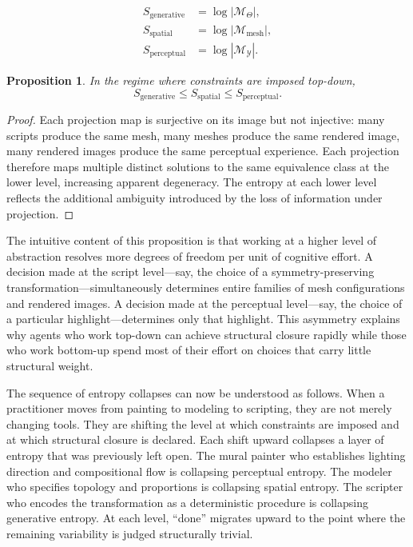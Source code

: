 \documentclass[11pt, twoside]{article}
\theoremstyle{plain}
\newtheorem{proposition}[theorem]{Proposition}
\theoremstyle{definition}
\theoremstyle{remark}
\begin{document}
\begin{align*}
S_{\text{generative}} &= \log |\mathcal{M}_\Theta|, \\
S_{\text{spatial}} &= \log |\mathcal{M}_{\text{mesh}}|, \\
S_{\text{perceptual}} &= \log |\mathcal{M}_{\mathcal{Y}}|.
\end{align*}

\begin{proposition}
\label{prop:entropy-ordering}
In the regime where constraints are imposed top-down,
\[
S_{\text{generative}} \leq S_{\text{spatial}} \leq S_{\text{perceptual}}.
\]
\end{proposition}

\begin{proof}
Each projection map is surjective on its image but not injective: many scripts produce the same mesh, many meshes produce the same rendered image, many rendered images produce the same perceptual experience. Each projection therefore maps multiple distinct solutions to the same equivalence class at the lower level, increasing apparent degeneracy. The entropy at each lower level reflects the additional ambiguity introduced by the loss of information under projection.
\end{proof}

The intuitive content of this proposition is that working at a higher level of abstraction resolves more degrees of freedom per unit of cognitive effort. A decision made at the script level---say, the choice of a symmetry-preserving transformation---simultaneously determines entire families of mesh configurations and rendered images. A decision made at the perceptual level---say, the choice of a particular highlight---determines only that highlight. This asymmetry explains why agents who work top-down can achieve structural closure rapidly while those who work bottom-up spend most of their effort on choices that carry little structural weight.

The sequence of entropy collapses can now be understood as follows. When a practitioner moves from painting to modeling to scripting, they are not merely changing tools. They are shifting the level at which constraints are imposed and at which structural closure is declared. Each shift upward collapses a layer of entropy that was previously left open. The mural painter who establishes lighting direction and compositional flow is collapsing perceptual entropy. The modeler who specifies topology and proportions is collapsing spatial entropy. The scripter who encodes the transformation as a deterministic procedure is collapsing generative entropy. At each level, ``done'' migrates upward to the point where the remaining variability is judged structurally trivial.
\end{document}
